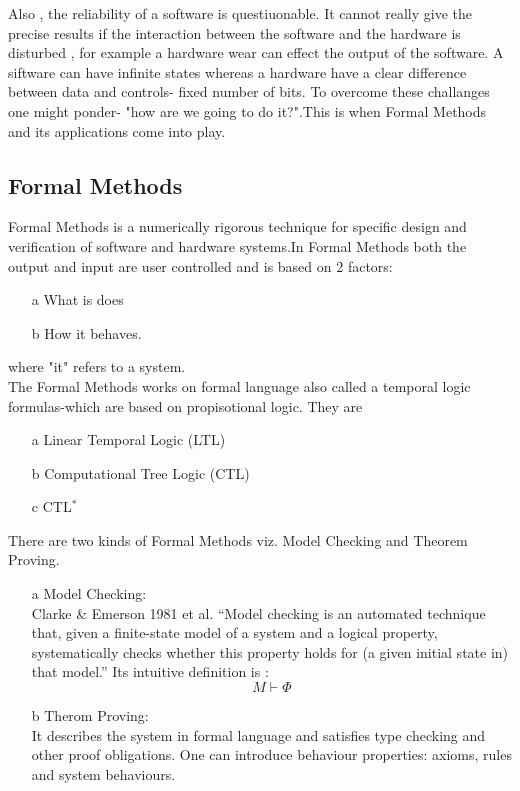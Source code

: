 \documentclass[a4paper,11pt,flegn]{article}
\begin{document}
Also , the reliability of a software is questiuonable. It cannot really give the precise results if the interaction between the software and the hardware is disturbed , for example a hardware wear can effect the output of the software. A siftware can have infinite states whereas a hardware have a clear difference between data and controls- fixed number of bits. To overcome these challanges one might ponder- "how are we going to do it?".This is when Formal Methods and its applications come into play.\\

\subsection{Formal Methods}
Formal Methods is  a numerically rigorous technique for specific design and verification of software and hardware systems.In Formal Methods both the output and input are user controlled and is based on 2 factors: \begin{enumerate}
\item[a]What is does
\item[b]How it behaves.
\end{enumerate}
where "it" refers to a system.\\
The Formal Methods works on formal language also called a temporal logic formulas-which are based on propisotional logic. They are \begin{enumerate}
\item[a]Linear Temporal Logic (LTL)
\item[b]Computational Tree Logic (CTL)
\item[c]CTL$^*$
\end{enumerate}
There are two kinds of Formal Methods viz. Model Checking and Theorem Proving.
\begin{enumerate}
\item[a]Model Checking:\\
Clarke \& Emerson 1981 et al. “Model checking is an automated technique that, given
a finite-state model of a system and a logical property,
systematically checks whether this property holds for
(a given initial state in) that model.”
Its intuitive definition is : $$M \vdash \Phi $$
\item[b]Therom Proving:\\
It describes the system in formal language and satisfies type checking and other proof obligations. One can introduce behaviour properties: axioms, rules and system behaviours.
\end{enumerate}
\end{document}
